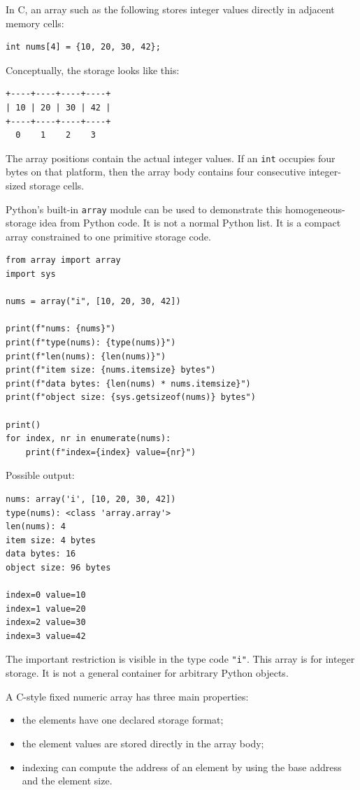 In C, an array such as the following stores integer values directly in adjacent memory cells:

\begin{verbatim}
int nums[4] = {10, 20, 30, 42};
\end{verbatim}

Conceptually, the storage looks like this:

\begin{verbatim}
+----+----+----+----+
| 10 | 20 | 30 | 42 |
+----+----+----+----+
  0    1    2    3
\end{verbatim}

The array positions contain the actual integer values. If an \texttt{int} occupies four bytes on that platform, then the array body contains four consecutive integer-sized storage cells.

Python's built-in \texttt{array} module can be used to demonstrate this homogeneous-storage idea from Python code. It is not a normal Python list. It is a compact array constrained to one primitive storage code.

\begin{verbatim}
from array import array
import sys

nums = array("i", [10, 20, 30, 42])

print(f"nums: {nums}")
print(f"type(nums): {type(nums)}")
print(f"len(nums): {len(nums)}")
print(f"item size: {nums.itemsize} bytes")
print(f"data bytes: {len(nums) * nums.itemsize}")
print(f"object size: {sys.getsizeof(nums)} bytes")

print()
for index, nr in enumerate(nums):
    print(f"index={index} value={nr}")
\end{verbatim}

Possible output:

\begin{verbatim}
nums: array('i', [10, 20, 30, 42])
type(nums): <class 'array.array'>
len(nums): 4
item size: 4 bytes
data bytes: 16
object size: 96 bytes

index=0 value=10
index=1 value=20
index=2 value=30
index=3 value=42
\end{verbatim}

The important restriction is visible in the type code \texttt{"i"}. This array is for integer storage. It is not a general container for arbitrary Python objects.

A C-style fixed numeric array has three main properties:

\begin{itemize}
    \item the elements have one declared storage format;
    \item the element values are stored directly in the array body;
    \item indexing can compute the address of an element by using the base address and the element size.
\end{itemize}

